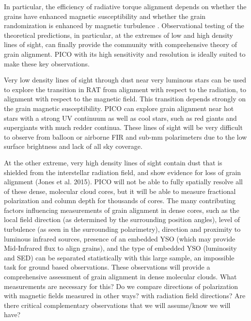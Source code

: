 \documentclass[PICOReport.tex]{subfiles}
\begin{document}
In particular, the efficiency of radiative torque alignment depends on whether the grains have enhanced magnetic susceptibility \citep{Lazarian2007b,Hoang2015}and whether the grain randomization is enhanced by magnetic turbulence \citep{Weingartner2008}. Observational testing of the theoretical predictions, in particular, at the extremes of low and high density lines of sight, can finally provide the community with comprehensive theory of grain alignment. PICO with its high sensitivity and resolution is ideally suited to make these key observations.

Very low density lines of sight through dust near very luminous stars can be used to explore the transition in RAT from alignment with respect to the radiation, to alignment with respect to the magnetic field. This transition depends strongly on the grain magnetic susceptibility.  PICO can explore grain alignment near hot stars with a strong UV continuum as well as cool stars, such as red giants and supergiants with much redder continua. These lines of sight will be very difficult to observe from balloon or airborne FIR and sub-mm polarimeters due to the low surface brightness and lack of all sky coverage.

At the other extreme, very high density lines of sight contain dust that is shielded from the interstellar radiation field, and show evidence for loss of grain alignment \citep{Goodman1995}(Jones et al. 2015). PICO will not be able to fully spatially resolve all of these dense, molecular cloud cores, but it will be able to measure fractional polarization and column depth for thousands of cores. The many contributing factors influencing measurements of grain alignment in dense cores, such as the local field direction (as determined by the surrounding position angles), level of turbulence (as seen in the surrounding polarimetry), direction and proximity to luminous infrared sources, presence of an embedded YSO (which may provide Mid-Infrared flux to align grains), and the type of embedded YSO (luminosity and SED) can be separated statistically with this large sample, an impossible task for ground based observations. These observations will provide a comprehensive assessment of grain alignment in dense molecular clouds. {\color{red} What measurements are necessary for this? Do we compare directions of polarization with magnetic fields measured in other ways? with radiation field directions? Are there critical complementary observations that we will assume/know we will have?}
\end{document}
